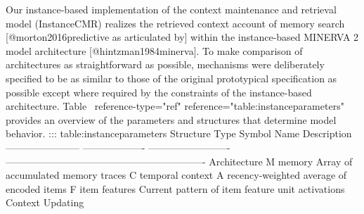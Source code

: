 Our instance-based implementation of the context maintenance and retrieval model (InstanceCMR) realizes the retrieved context account of memory search [@morton2016predictive as articulated by] within the instance-based MINERVA 2 model architecture [@hintzman1984minerva]. To make comparison of architectures as straightforward as possible, mechanisms were deliberately specified to be as similar to those of the original prototypical specification as possible except where required by the constraints of the instance-based architecture. Table  \markdownRendererLeftBrace{}reference-type="ref" reference="table:instanceparameters"\markdownRendererRightBrace{} provides an overview of the parameters and structures that determine model behavior.\markdownRendererInterblockSeparator
{}::: \markdownRendererLeftBrace{}\markdownRendererHash{}table:instanceparameters\markdownRendererRightBrace{} Structure Type Symbol Name Description ----------------------- ------------------- ------------------------- ------------------------------------------------------------- Architecture\markdownRendererLineBreak
{}\markdownRendererDollarSign{}M\markdownRendererDollarSign{} memory Array of accumulated memory traces \markdownRendererDollarSign{}C\markdownRendererDollarSign{} temporal context A recency-weighted average of encoded items \markdownRendererDollarSign{}F\markdownRendererDollarSign{} item features Current pattern of item feature unit activations Context Updating\markdownRendererLineBreak

